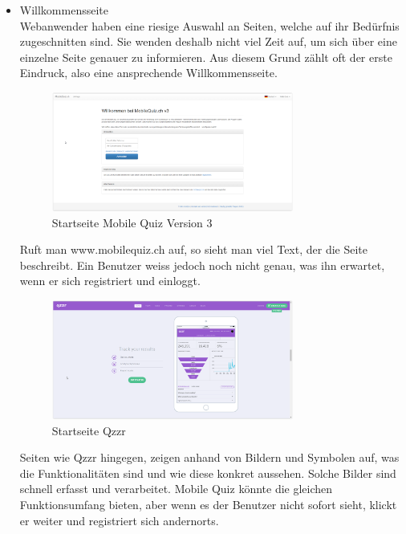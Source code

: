 	\begin{itemize}
		\item Willkommensseite \\
		Webanwender haben eine riesige Auswahl an Seiten, welche auf ihr Bedürfnis zugeschnitten sind. Sie wenden deshalb nicht viel Zeit auf, um sich über eine einzelne Seite genauer zu informieren. Aus diesem Grund zählt oft der erste Eindruck, also eine ansprechende Willkommensseite. \\
		
		\begin{figure}[H]
			\centering
			\includegraphics[width=0.75\textwidth]{Images/MobileQuiz_StartPage.PNG}
			\caption{Startseite Mobile Quiz Version 3}
		\end{figure}
		
		Ruft man www.mobilequiz.ch auf, so sieht man viel Text, der die Seite beschreibt. Ein Benutzer weiss jedoch noch nicht genau, was ihn erwartet, wenn er sich registriert und einloggt.
		
		\begin{figure}[H]
			\centering
			\includegraphics[width=0.75\textwidth]
			{Images/Qzzr_StartPage_Statistics.PNG}
			\caption{Startseite Qzzr}
		\end{figure}
				
		Seiten wie Qzzr \cite{qzzr.com} hingegen, zeigen anhand von Bildern und Symbolen auf, was die Funktionalitäten sind und wie diese konkret aussehen. Solche Bilder sind schnell erfasst  und verarbeitet.
		Mobile Quiz könnte die gleichen Funktionsumfang bieten, aber wenn es der Benutzer nicht sofort sieht, klickt er weiter und registriert sich andernorts.
		

\end{itemize}
